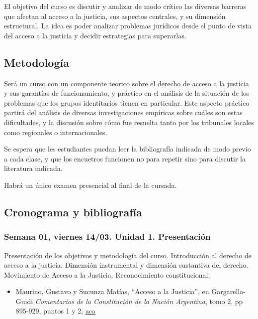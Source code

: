 \documentclass[
]{article}
\providecommand{\tightlist}{%
  \setlength{\itemsep}{0pt}\setlength{\parskip}{0pt}}
\begin{document}
El objetivo del curso es discutir y analizar de modo crítico las
diversas barreras que afectan al acceso a la justicia, sus aspectos
centrales, y su dimensión estructural. La idea es poder analizar
problemas jurídicos desde el punto de vista del acceso a la justicia y
decidir estrategias para superarlas.

\subsection{Metodología}\label{metodologuxeda}

Será un curso con un componente teorico sobre el derecho de acceso a la
justicia y sus garantías de funcionamiento, y práctico en el análisis de
la situación de los problemas que los grupos identitarios tienen en
particular. Este aspecto práctico partirá del análisis de diversas
investigaciones empíricas sobre cuáles son estas dificultades, y la
discusión sobre cómo fue resuelta tanto por los tribunales locales como
regionales o internacionales.

Se espera que les estudiantes puedan leer la bibliografía indicada de
modo previo a cada clase, y que los encuetros funcionen no para repetir
sino para discutir la literatura indicada.

Habrá un único examen presencial al final de la cursada.

\subsection{Cronograma y
bibliografía}\label{cronograma-y-bibliografuxeda}

\subsubsection{Semana 01, viernes 14/03. Unidad 1.
Presentación}\label{semana-01-viernes-1403.-unidad-1.-presentaciuxf3n}

Presentación de los objetivos y metodología del curso. Introducción al
derecho de acceso a la justicia. Dimensión instrumental y dimensión
sustantiva del derecho. Movimiento de Acceso a la Justicia.
Reconocimiento constitucional.

\begin{itemize}
\tightlist
\item
  Maurino, Gustavo y Sucunza Matías, ``Acceso a la Justicia'', en
  Gargarella- Guidi \emph{Comentarios de la Constitución de la Nación
  Argentina}, tomo 2, pp 895-929, puntos 1 y 2,
  \href{https://drive.google.com/file/d/1On39ejMciqQNjJIpz1fPseKak_KCjuuF/view?usp=sharing}{aca}
\end{itemize}
\end{document}
